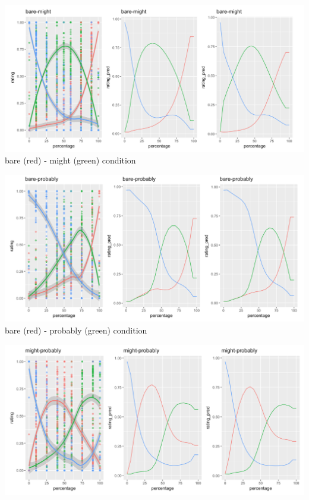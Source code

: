 \documentclass[lucida,biblatex]{sp} %
\begin{document}
\begin{center}
\includegraphics[width=\textwidth]{figures/bare-might-predictions.png} \\
bare (red) - might (green) condition

\vspace{2em}

\includegraphics[width=\textwidth]{figures/bare-probably-predictions.png} \\
bare (red) - probably (green) condition

\vspace{2em}


\includegraphics[width=\textwidth]{figures/might-probably-predictions.png}


\end{center}
\end{document}
